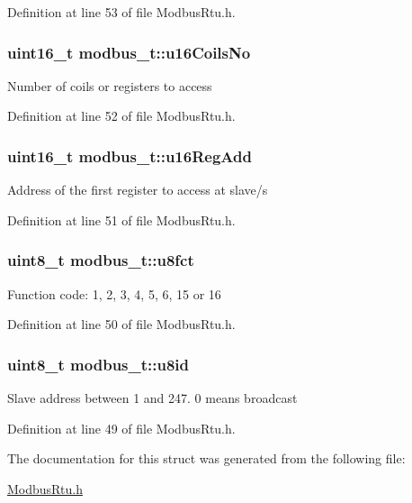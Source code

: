 Definition at line 53 of file Modbus\-Rtu.\-h.

\hypertarget{structmodbus__t_a5b9cee9c1a9415d927543f6cf054eb43}{
\subsubsection[{u16\-Coils\-No}]{\setlength{\rightskip}{0pt plus 5cm}uint16\-\_\-t modbus\-\_\-t\-::u16\-Coils\-No}}\label{structmodbus__t_a5b9cee9c1a9415d927543f6cf054eb43}
Number of coils or registers to access 

Definition at line 52 of file Modbus\-Rtu.\-h.

\hypertarget{structmodbus__t_a224ead9ff72467696e94fba9cf06bd3c}{
\subsubsection[{u16\-Reg\-Add}]{\setlength{\rightskip}{0pt plus 5cm}uint16\-\_\-t modbus\-\_\-t\-::u16\-Reg\-Add}}\label{structmodbus__t_a224ead9ff72467696e94fba9cf06bd3c}
Address of the first register to access at slave/s 

Definition at line 51 of file Modbus\-Rtu.\-h.

\hypertarget{structmodbus__t_a57d1630d4548e5d50d79e206a48b09bc}{
\subsubsection[{u8fct}]{\setlength{\rightskip}{0pt plus 5cm}uint8\-\_\-t modbus\-\_\-t\-::u8fct}}\label{structmodbus__t_a57d1630d4548e5d50d79e206a48b09bc}
Function code\-: 1, 2, 3, 4, 5, 6, 15 or 16 

Definition at line 50 of file Modbus\-Rtu.\-h.

\hypertarget{structmodbus__t_af78ad11f93e63022a1c279de7206358c}{
\subsubsection[{u8id}]{\setlength{\rightskip}{0pt plus 5cm}uint8\-\_\-t modbus\-\_\-t\-::u8id}}\label{structmodbus__t_af78ad11f93e63022a1c279de7206358c}
Slave address between 1 and 247. 0 means broadcast 

Definition at line 49 of file Modbus\-Rtu.\-h.



The documentation for this struct was generated from the following file\-:\begin{DoxyCompactItemize}
\item 
\hyperlink{_modbus_rtu_8h}{Modbus\-Rtu.\-h}\end{DoxyCompactItemize}
